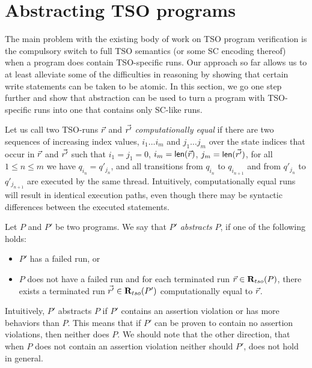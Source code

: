 \section{Abstracting TSO programs}
\label{sec:abstracting-tso-programs}
The main problem with the existing body of work on TSO program verification is the compulsory switch to full TSO semantics (or some SC encoding thereof) when a program does contain TSO-specific runs.
Our approach so far allows us to at least alleviate some of the difficulties in reasoning by showing that certain write statements can be taken to be atomic.
In this section, we go one step further and show that abstraction can be used to turn a program with TSO-specific runs into one that contains only SC-like runs.

Let us call two TSO-runs $\vec{r}$ and $\vec{r'}$ {\em computationally equal} if there are two sequences of increasing index values, $i_1\ldots i_m$ and $j_1\ldots j_m$ over the state indices that occur in $\vec{r}$ and $\vec{r'}$ such that $i_1=j_1=0$, $i_m=\mathsf{len}(\vec{r})$, $j_m=\mathsf{len}(\vec{r'})$, for all $1\leq n\leq m$ we have $q_{i_n}=q'_{j_n}$, and all transitions from $q_{i_n}$ to $q_{i_{n+1}}$ and from $q'_{j_n}$ to $q'_{j_{n+1}}$ are executed by the same thread.
Intuitively, computationally equal runs will result in identical execution paths, even though there may be syntactic differences between the executed statements.

\begin{definition}
Let $P$ and $P'$ be two programs.
We say that $P'$ {\em abstracts} $P$, if one of the following holds:
\begin{itemize}
\item $P'$ has a failed run, or
\item $P$ does not have a failed run and for each terminated run $\vec{r}\in\mathbf{R}_{tso}(P)$, there exists a terminated run $\vec{r'}\in\mathbf{R}_{tso}(P')$ computationally equal to $\vec{r}$.
\end{itemize}
\end{definition}
Intuitively, $P'$ abstracts $P$ if $P'$ contains an assertion violation or has more behaviors than $P$.
This means that if $P'$ can be proven to contain no assertion violations, then neither does $P$.
We should note that the other direction, that when $P$ does not contain an assertion violation neither should $P'$, does not hold in general.

